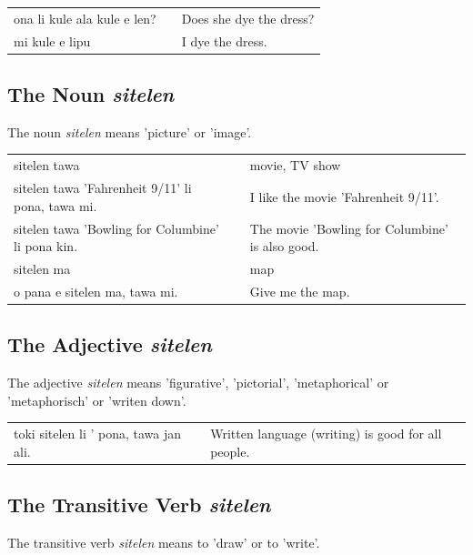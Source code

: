 \begin{supertabular}{p{5,5cm}|ll}
    ona li kule ala kule e len? &  & Does she dye the dress? \\
    mi kule e lipu              &  & I dye the dress.        \\
\end{supertabular}

\subsection*{The Noun \textit{sitelen}}
The noun \textit{sitelen} means 'picture' or 'image'.

\begin{supertabular}{p{5,5cm}|ll}
    sitelen tawa                                      &  & movie, TV show                                  \\
    sitelen tawa 'Fahrenheit 9/11' li pona, tawa mi.  &  & I like the movie 'Fahrenheit 9/11'.             \\
    sitelen tawa 'Bowling for Columbine' li pona kin. &  & The movie 'Bowling for Columbine' is also good. \\
    sitelen ma                                        &  & map                                             \\
    o pana e sitelen ma, tawa mi.                     &  & Give me the map.                                \\
\end{supertabular}

\subsection*{The Adjective \textit{sitelen}}
The adjective \textit{sitelen} means 'figurative', 'pictorial', 'metaphorical' or 'metaphorisch' or 'writen down'.

\begin{supertabular}{p{5,5cm}|ll}
    toki sitelen li ' pona, tawa jan ali. &  & Written language (writing) is good for all people. \\
\end{supertabular}

\subsection*{The Transitive Verb \textit{sitelen}}
The transitive verb \textit{sitelen} means to 'draw' or to 'write'.

